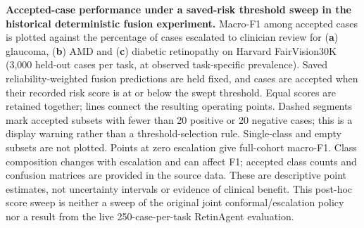 \caption{\textbf{Accepted-case performance under a saved-risk threshold sweep
in the historical deterministic fusion experiment.}
Macro-F1 among accepted cases is plotted against the percentage of cases
escalated to clinician review for (\textbf{a}) glaucoma, (\textbf{b}) AMD and
(\textbf{c}) diabetic retinopathy on Harvard FairVision30K (3,000 held-out
cases per task, at observed task-specific prevalence).
Saved reliability-weighted fusion predictions are held fixed, and cases are
accepted when their recorded risk score is at or below the swept threshold.
Equal scores are retained together; lines connect the resulting operating
points. Dashed segments mark accepted subsets with fewer than 20 positive or
20 negative cases; this is a display warning rather than a threshold-selection
rule. Single-class and empty subsets are not plotted. Points at zero escalation
give full-cohort macro-F1. Class composition changes with escalation and can
affect F1; accepted class counts and confusion matrices are provided in the
source data. These are descriptive point estimates, not uncertainty intervals
or evidence of clinical benefit. This post-hoc score sweep is neither a sweep
of the original joint conformal/escalation policy nor a result from the live
250-case-per-task RetinAgent evaluation.}
\label{fig:historical_fusion_escalation}
